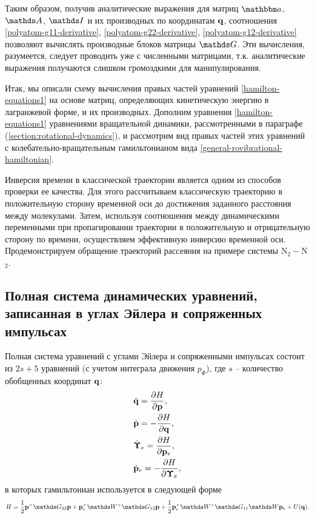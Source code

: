 Таким образом, получив аналитические выражения для матриц $\bba$, $\bbA$, $\bbI$ и их производных по координатам $\mathbf{q}$, соотношения \eqref{polyatom-g11-derivative}, \eqref{polyatom-g22-derivative}, \eqref{polyatom-g12-derivative} позволяют вычислять производные блоков матрицы $\bbG$. Эти вычисления, разумеется, следует проводить уже с численными матрицами, т.к. аналитические выражения получаются слишком громоздкими для манипулирования. \par
Итак, мы описали схему вычисления правых частей уравнений \eqref{hamilton-equations1} на основе матриц, определяющих кинетическую энергию в лагранжевой форме, и их производных. Дополним уравнения \eqref{hamilton-equations1} уравнениями вращательной динамики, рассмотренными в параграфе (\ref{section:rotational-dynamics}), и рассмотрим вид правых частей этих уравнений с колебательно-вращательным гамильтонианом вида \eqref{general-rovibrational-hamiltonian}. \par
Инверсия времени в классической траектории является одним из способов проверки ее качества. Для этого рассчитываем классическую траекторию в положительную сторону временной оси до достижения заданного расстояния между молекулами. Затем, используя соотношения между динамическими переменными при пропагировании траектории в положительную и отрицательную сторону по времени, осуществляем эффективную инверсию временной оси. Продемонстрируем обращение траекторий рассеяния на примере системы N$_2-$N$_2$. 

\subsection{Полная система динамических уравнений, записанная в углах Эйлера и сопряженных импульсах}
    Полная система уравнений с углами Эйлера и сопряженными импульсах состоит из $2s + 5$ уравнений (с учетом интеграла движения $p_\Phi$), где $s$ -- количество обобщенных координат $\mathbf{q}$:
\begin{gather}
    \begin{aligned}
        &\dot{\mathbf{q}} = \frac{\partial H}{\partial \mathbf{p}}, \\
        &\dot{\mathbf{p}} = -\frac{\partial H}{\partial \mathbf{q}}, \\
        &\dot{\boldsymbol{\Upsilon}}_e = \frac{\partial H}{\partial \mathbf{p}_e}, \\
        &\dot{\mathbf{p}}_e = - \frac{\partial H}{\partial \boldsymbol{\Upsilon}_e},
    \end{aligned} \label{full-system-euler}
\end{gather}
%
в которых гамильтониан используется в следующей форме
\begin{gather}
    H = \frac{1}{2} \mf{p}^+ \bbG_{22} \mf{p} + \mf{p}^+_e \bbW^+ \bbG_{12} \mf{p} + \frac{1}{2} \mf{p}^+_e \bbW^+ \bbG_{11} \bbW \pe + U(\mf{q}). \label{general-rovibrational-hamiltonian-euler}
\end{gather}

